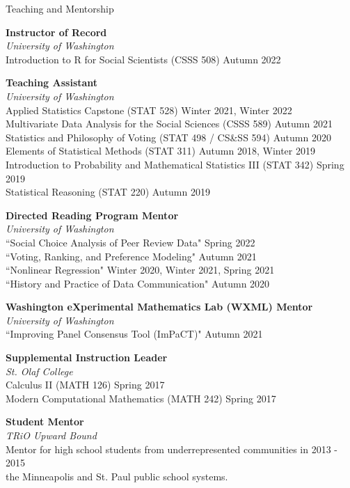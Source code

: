 \documentclass{resume} %
\begin{document}
\begin{rSection}{Teaching and Mentorship}

{\bf Instructor of Record}
\\ {\it University of Washington}
\\ Introduction to R for Social Scientists (CSSS 508) \hfill {Autumn 2022}

{\bf Teaching Assistant}
\\ {\it University of Washington}
\\ Applied Statistics Capstone (STAT 528) \hfill Winter 2021, Winter 2022
\\ Multivariate Data Analysis for the Social Sciences (CSSS 589) \hfill Autumn 2021
\\ Statistics and Philosophy of Voting (STAT 498 / CS&SS 594) \hfill Autumn 2020
\\ Elements of Statistical Methods (STAT 311) \hfill {Autumn 2018, Winter 2019}
\\ Introduction to Probability and Mathematical Statistics III (STAT 342) \hfill {Spring 2019}
\\ Statistical Reasoning (STAT 220) \hfill {Autumn 2019}

{\bf Directed Reading Program Mentor}
\\ {\it University of Washington}
\\ ``Social Choice Analysis of Peer Review Data" \hfill {Spring 2022}
\\ ``Voting, Ranking, and Preference Modeling" \hfill {Autumn 2021}
\\ ``Nonlinear Regression" \hfill {Winter 2020, Winter 2021, Spring 2021}
\\ ``History and Practice of Data Communication" \hfill Autumn 2020

{\bf Washington eXperimental Mathematics Lab (WXML) Mentor}
\\ {\it University of Washington}
\\ ``Improving Panel Consensus Tool (ImPaCT)" \hfill {Autumn 2021}


{\bf Supplemental Instruction Leader}
\\ {\it St. Olaf College}
\\ Calculus II (MATH 126) \hfill {Spring 2017}
\\ Modern Computational Mathematics (MATH 242) \hfill {Spring 2017}

{\bf Student Mentor} 
\\ {\it TRiO Upward Bound}
\\ Mentor for high school students from underrepresented communities in \hfill {2013 - 2015}
\\the Minneapolis and St. Paul public school systems.

\end{rSection}
\end{document}
